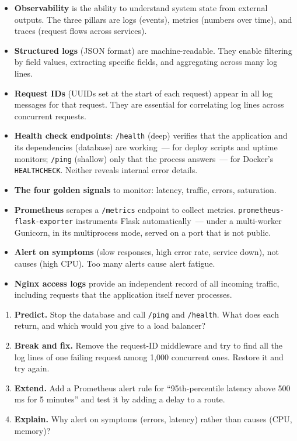 \label{35-observability:key-takeaways}
\begin{takeaways}

\begin{itemize}
\tightlist
\item
  \textbf{Observability} is the ability to understand system state from external outputs. The three pillars are logs (events), metrics (numbers over time), and traces (request flows across services).
\item
  \textbf{Structured logs} (JSON format) are machine-readable. They enable filtering by field values, extracting specific fields, and aggregating across many log lines.
\item
  \textbf{Request IDs} (UUIDs set at the start of each request) appear in all log messages for that request. They are essential for correlating log lines across concurrent requests.
\item
  \textbf{Health check endpoints}: \texttt{/health} (deep) verifies that the application and its dependencies (database) are working~--- for deploy scripts and uptime monitors; \texttt{/ping} (shallow) only that the process answers~--- for Docker's \texttt{HEALTHCHECK}. Neither reveals internal error details.
\item
  \textbf{The four golden signals} to monitor: latency, traffic, errors, saturation.
\item
  \textbf{Prometheus} scrapes a \texttt{/metrics} endpoint to collect metrics. \texttt{prometheus-}\allowbreak{}\texttt{flask-}\allowbreak{}\texttt{exporter} instruments Flask automatically~--- under a multi-worker Gunicorn, in its multiprocess mode, served on a port that is not public.
\item
  \textbf{Alert on symptoms} (slow responses, high error rate, service down), not causes (high CPU). Too many alerts cause alert fatigue.
\item
  \textbf{Nginx access logs} provide an independent record of all incoming traffic, including requests that the application itself never processes.
\end{itemize}

\end{takeaways}

\label{35-observability:exercises}

\begin{enumerate}
\def\labelenumi{\arabic{enumi}.}
\tightlist
\item
  \textbf{Predict.} Stop the database and call \texttt{/ping} and \texttt{/health}. What does each return, and which would you give to a load balancer?
\item
  \textbf{Break and fix.} Remove the request-ID middleware and try to find all the log lines of one failing request among 1,000 concurrent ones. Restore it and try again.
\item
  \textbf{Extend.} Add a Prometheus alert rule for ``95th-percentile latency above 500 ms for 5 minutes'' and test it by adding a delay to a route.
\item
  \textbf{Explain.} Why alert on symptoms (errors, latency) rather than causes (CPU, memory)?
\end{enumerate}

